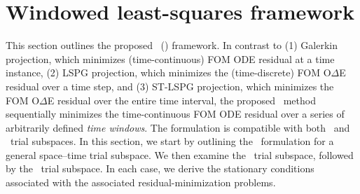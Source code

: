 \section{Windowed least-squares framework}\label{sec:tclspg} 
This section
outlines the proposed \methodNameLower\ 
(\methodAcronym) framework. In contrast to (1) Galerkin projection, 
which minimizes (time-continuous) FOM ODE residual at a time instance, 
(2) LSPG projection, 
which minimizes
the (time-discrete) FOM O$\Delta$E residual 
over a time step, and (3) ST-LSPG projection, 
which minimizes
the  FOM O$\Delta$E residual 
over the entire time interval, the proposed \methodAcronym\ method sequentially minimizes the 
time-continuous FOM ODE residual over a series of arbitrarily defined
\textit{time windows}. The formulation is compatible with both \spatialAcronym\ and \spaceTimeAcronym\ trial subspaces. 
In this section, we start by outlining the \methodAcronym\ formulation  
for a general space--time trial subspace. We then examine the \spatialAcronym\ 
trial subspace, followed by the \spaceTimeAcronym\ trial subspace. In each case, we derive the stationary conditions 
associated with the associated residual-minimization problems.

%
